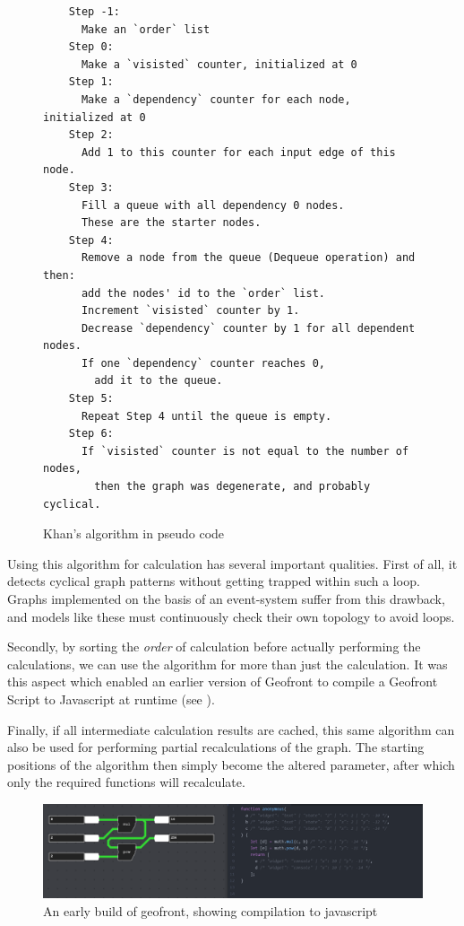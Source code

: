 \begin{figure}
  \centering
  \begin{lstlisting}
    Step -1: 
      Make an `order` list
    Step 0: 
      Make a `visisted` counter, initialized at 0
    Step 1: 
      Make a `dependency` counter for each node, initialized at 0
    Step 2: 
      Add 1 to this counter for each input edge of this node.
    Step 3: 
      Fill a queue with all dependency 0 nodes. 
      These are the starter nodes.
    Step 4: 
      Remove a node from the queue (Dequeue operation) and then:
      add the nodes' id to the `order` list.
      Increment `visisted` counter by 1.
      Decrease `dependency` counter by 1 for all dependent nodes.
      If one `dependency` counter reaches 0, 
        add it to the queue.
    Step 5: 
      Repeat Step 4 until the queue is empty.
    Step 6: 
      If `visisted` counter is not equal to the number of nodes, 
        then the graph was degenerate, and probably cyclical. 
    \end{lstlisting}
  \caption[Kahns algorithm]{Khan's algorithm in pseudo code}
  \label{fig:kahn}
\end{figure}

Using this algorithm for calculation has several important qualities. 
First of all, it detects cyclical graph patterns without getting trapped within such a loop. 
Graphs implemented on the basis of an event-system suffer from this drawback, and models like these must continuously check their own topology to avoid loops. 

Secondly, by sorting the \emph{order} of calculation before actually performing the calculations, we can use the algorithm for more than just the calculation.
It was this aspect which enabled an earlier version of Geofront to compile a Geofront Script to Javascript at runtime (see ).

Finally, if all intermediate calculation results are cached, this same algorithm can also be used for performing partial recalculations of the graph. 
The starting positions of the algorithm then simply become the altered parameter, after which only the required functions will recalculate. 

\begin{figure}
  \centering
  \graphicspath{ {../../assets/images/implementation/} }
  \includegraphics[width=\linewidth]{early-geofront.png}
  \caption[Geofront to js]{An early build of geofront, showing compilation to javascript}
  \label{fig:early-geofront-compile-to-js}
\end{figure}

